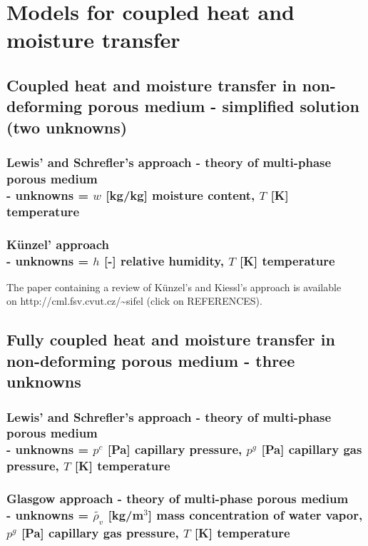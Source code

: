 \section{Models for coupled heat and moisture transfer}



\subsection{Coupled heat and moisture transfer in non-deforming porous medium - simplified solution (two unknowns)}
\subsubsection{Lewis' and Schrefler's approach - theory of multi-phase porous medium\\
- unknowns = $w$ [kg/kg] moisture content, $T$ [K] temperature}

\subsubsection{K\"unzel' approach\\- unknowns = $h$ [-] relative humidity, $T$ [K] temperature}
The paper containing a review of K\"unzel's and Kiessl's approach is available\\ on \textsf {http://cml.fsv.cvut.cz/\~{}sifel} 
(click on REFERENCES).\\


\subsection{Fully coupled heat and moisture transfer in non-deforming porous medium - three unknowns}
\subsubsection{Lewis' and Schrefler's approach - theory of multi-phase porous medium\\
- unknowns = $p^c$ [Pa] capillary pressure, $p^g$ [Pa] capillary gas pressure, $T$ [K] temperature}


\subsubsection{Glasgow approach - theory of multi-phase porous medium\\
- unknowns = $\widetilde{\rho_v}$ [kg/m$^3$] mass concentration of water vapor, 
$p^g$ [Pa] capillary gas pressure, $T$ [K] temperature}


